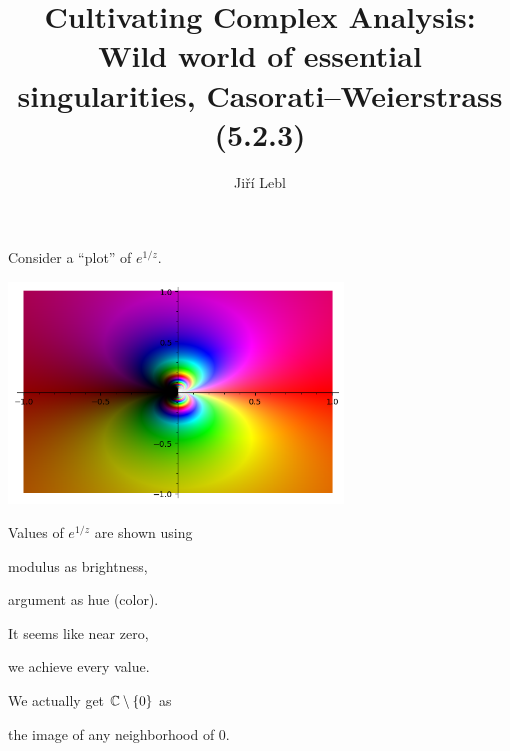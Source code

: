 \documentclass[10pt,aspectratio=169]{beamer}
\author{Ji\v{r}\'i Lebl}
\institute[OSU]{%
Departemento pri Matematiko de Oklahoma {\^S}tata Universitato}
\title{Cultivating Complex Analysis:\\%
Wild world of essential singularities, Casorati--Weierstrass (5.2.3)}
\date{}
\begin{document}
\begin{frame}
\titlepage
\end{frame}

\begin{frame}
Consider a ``plot'' of $e^{1/z}$.

\vspace*{-15pt}
\hspace*{2.2in}\includegraphics[width=3.5in]{essential-sing.png}

\vspace*{-2.05in}
Values of $e^{1/z}$ are shown using

\medskip
modulus as brightness,

\medskip
argument as hue (color).

\medskip
\pause

It seems like near zero,

we achieve every value.

\medskip
\pause

We actually get ${\mathbb{C}} \setminus \{ 0 \}$ as

the image of any neighborhood of $0$.

\end{frame}
\end{document}
